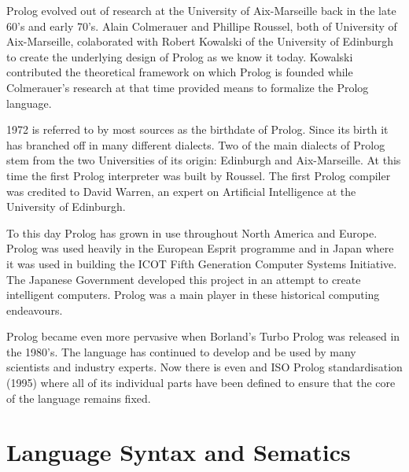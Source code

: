 \documentclass[14pt]{article}
\begin{document}
Prolog evolved out of research at the University of Aix-Marseille back in the late 60's and early 70's. Alain Colmerauer and Phillipe Roussel, both of University of Aix-Marseille, colaborated with Robert Kowalski of the University of Edinburgh to create the underlying design of Prolog as we know it today. Kowalski contributed the theoretical framework on which Prolog is founded while Colmerauer's research at that time provided means to formalize the Prolog language. 

1972 is referred to by most sources as the birthdate of Prolog. Since its birth it has branched off in many different dialects. Two of the main dialects of Prolog stem from the two Universities of its origin: Edinburgh and Aix-Marseille. At this time the first Prolog interpreter was built by Roussel. The first Prolog compiler was credited to David Warren, an expert on Artificial Intelligence at the University of Edinburgh. 

To this day Prolog has grown in use throughout North America and Europe. Prolog was used heavily in the European Esprit programme and in Japan where it was used in building the ICOT Fifth Generation Computer Systems Initiative. The Japanese Government developed this project in an attempt to create intelligent computers. Prolog was a main player in these historical computing endeavours. 

Prolog became even more pervasive when Borland's Turbo Prolog was released in the 1980's. The language has continued to develop and be used by many scientists and industry experts. Now there is even and ISO Prolog standardisation (1995) where all of its individual parts have been defined to ensure that the core of the language remains fixed. 
\newpage 
\section{Language Syntax and Sematics}
\end{document}
